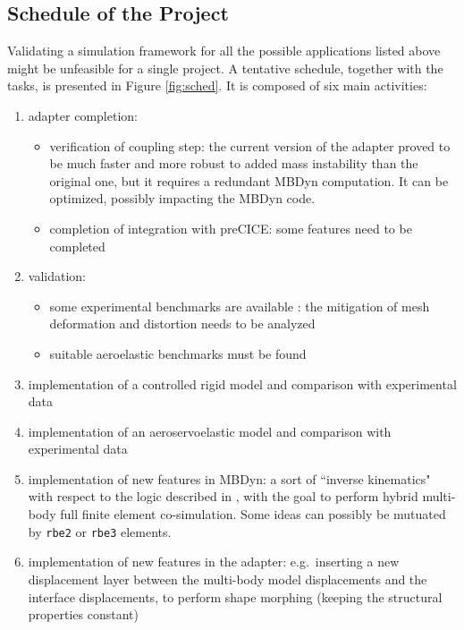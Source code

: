 
\subsection*{Schedule of the Project}

Validating a simulation framework for all the possible applications listed above might be unfeasible for a single project. A tentative schedule, together with the tasks, is presented in Figure \ref{fig:sched}. It is composed of six main activities:

\begin{enumerate}
    \item adapter completion:
    \begin{itemize}
        \item verification of coupling step: the current version of the adapter \cite{caccia2021coupling}  proved to be much faster and more robust to added mass instability \cite{van2009added} than the original one, but it requires a redundant MBDyn computation. It can be optimized, possibly impacting the MBDyn code.
        \item completion of integration with preCICE: some features need to be completed 
    \end{itemize}

    \item validation: 
    \begin{itemize}
        \item some experimental benchmarks are available \cite{heathcote2008effect}: the mitigation of mesh deformation and distortion \cite{de2007mesh} needs to be analyzed
        \item suitable aeroelastic benchmarks must be found 
    \end{itemize}
    
    \item implementation of a controlled rigid model and comparison with experimental data 
    
    \item implementation of an aeroservoelastic model and comparison with experimental data
    
    \item implementation of new features in MBDyn: a sort of ``inverse kinematics" with respect to the logic described in \cite{quaranta2005conservative}, with the goal to perform hybrid multi-body full finite element co-simulation. Some ideas can possibly be mutuated by \texttt{rbe2} or \texttt{rbe3} elements.

    \item implementation of new features in the adapter: e.g.\ inserting a new displacement layer  between the multi-body model displacements and the interface displacements, to perform shape morphing (keeping the structural properties constant)
    
\end{enumerate}


